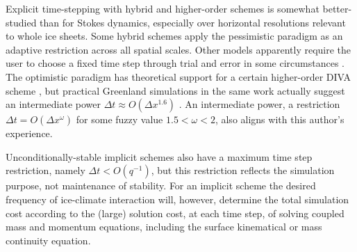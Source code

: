 \documentclass[review,letterpaper]{igs}
\begin{document}
Explicit time-stepping with hybrid and higher-order schemes is somewhat better-studied than for Stokes dynamics, especially over horizontal resolutions relevant to whole ice sheets.  Some hybrid schemes apply the pessimistic paradigm as an adaptive restriction \citep{Winkelmannetal2011} across all spatial scales.  Other models apparently require the user to choose a fixed time step through trial and error in some circumstances \citep[for example]{Fischleretal2022,Robinsonetal2022}.  The optimistic paradigm has theoretical support for a certain higher-order DIVA scheme \citep[Equation (52)]{Robinsonetal2022}, but practical Greenland simulations in the same work actually suggest an intermediate power $\Delta t \approx O(\Delta x^{1.6})$ \citep[Figure 3(a)]{Robinsonetal2022}.  An intermediate power, a restriction $\Delta t = O(\Delta x^\omega)$ for some fuzzy value $1.5<\omega<2$, also aligns with this author's experience.

Unconditionally-stable implicit schemes also have a maximum time step restriction, namely $\Delta t < O(q^{-1})$, but this restriction reflects the simulation purpose, not maintenance of stability.  For an implicit scheme the desired frequency of ice-climate interaction will, however, determine the total simulation cost according to the (large) solution cost, at each time step, of solving coupled mass and momentum equations, including the surface kinematical or mass continuity equation.

\end{document}
